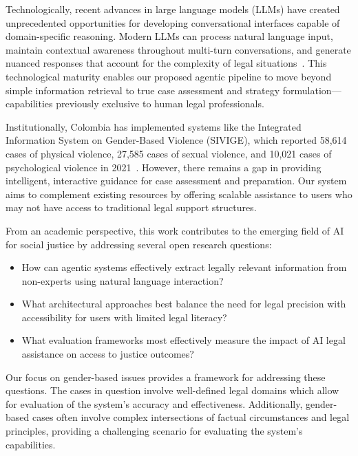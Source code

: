 Technologically, recent advances in large language models (LLMs) 
have created unprecedented opportunities for developing conversational 
interfaces capable of domain-specific reasoning. Modern LLMs can 
process natural language input, maintain contextual awareness 
throughout multi-turn conversations, and generate nuanced 
responses that account for the complexity of legal 
situations~\cite{darrow2023}. This technological maturity 
enables our proposed agentic pipeline to move beyond simple 
information retrieval to true case assessment and strategy 
formulation—capabilities previously exclusive to human legal 
professionals.

Institutionally, Colombia has implemented systems like the 
Integrated Information System on Gender-Based Violence (SIVIGE), 
which reported 58,614 cases of physical violence, 27,585 cases of 
sexual violence, and 10,021 cases of psychological violence in 
2021~\cite{advocates2023}. However, there remains a gap in 
providing intelligent, interactive guidance for case assessment 
and preparation. Our system aims to complement existing resources 
by offering scalable assistance to users who may not have access 
to traditional legal support structures.

From an academic perspective, this work contributes to the 
emerging field of AI for social justice by addressing several 
open research questions:

\begin{itemize}
\item How can agentic systems effectively extract legally relevant information from non-experts using natural language interaction?
\item What architectural approaches best balance the need for legal precision with accessibility for users with limited legal literacy?
\item What evaluation frameworks most effectively measure the impact of AI legal assistance on access to justice outcomes?
\end{itemize}

Our focus on gender-based issues provides a framework for addressing these questions. The cases in question involve well-defined legal domains which allow for evaluation of the system's accuracy and effectiveness. 
Additionally, gender-based cases 
often involve complex intersections of factual circumstances 
and legal principles, providing a 
challenging scenario for evaluating 
the system’s capabilities.

